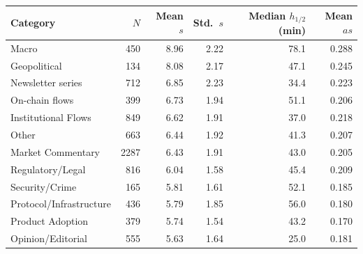 \begin{tabular}{lrrrrr}
\toprule
Category & $N$ & Mean $s$ & Std.\ $s$ & Median $h_{1/2}$ (min) & Mean $as$ \\
\midrule
Macro & 450 & 8.96 & 2.22 & 78.1 & 0.288 \\
Geopolitical & 134 & 8.08 & 2.17 & 47.1 & 0.245 \\
Newsletter series & 712 & 6.85 & 2.23 & 34.4 & 0.223 \\
On-chain flows & 399 & 6.73 & 1.94 & 51.1 & 0.206 \\
Institutional Flows & 849 & 6.62 & 1.91 & 37.0 & 0.218 \\
Other & 663 & 6.44 & 1.92 & 41.3 & 0.207 \\
Market Commentary & 2287 & 6.43 & 1.91 & 43.0 & 0.205 \\
Regulatory/Legal & 816 & 6.04 & 1.58 & 45.4 & 0.209 \\
Security/Crime & 165 & 5.81 & 1.61 & 52.1 & 0.185 \\
Protocol/Infrastructure & 436 & 5.79 & 1.85 & 56.0 & 0.180 \\
Product Adoption & 379 & 5.74 & 1.54 & 43.2 & 0.170 \\
Opinion/Editorial & 555 & 5.63 & 1.64 & 25.0 & 0.181 \\
\bottomrule
\end{tabular}
